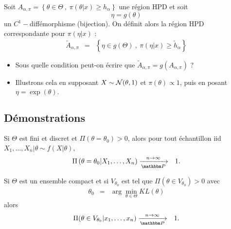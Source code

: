 \documentclass[10pt]{article}
\begin{document}
\if{}
\begin{exec}
Soit $A_{\alpha,\pi}=\left\{\theta\in\Theta  \ , \ \pi(\theta|x)\geq h_{\alpha}\right\}$ une région HPD et soit 
$$
\eta = g(\theta)
$$
un $C^1-$diffémorphisme (bijection). On définit alors la région HPD correspondante pour $\pi(\eta|x)$ :
\begin{eqnarray*}
\tilde{A}_{\alpha,\pi} & = & \left\{\eta\in g(\Theta)  \ , \ \pi(\eta|x)\geq \tilde{h}_{\alpha}\right\}
\end{eqnarray*}
\begin{itemize}
    \item Sous quelle condition peut-on écrire que $\tilde{A}_{\alpha,\pi}=g\left(A_{\alpha,\pi}\right)$ ?
    \item Illustrons cela en supposant $X\sim{\cal{N}}(\theta,1)$ et $\pi(\theta)\propto 1$, puis en posant $\eta=\exp(\theta)$.
\end{itemize}
\end{exec}

 
\fi



\subsection{Démonstrations}

\if{}
\begin{theorem}
Si $\Theta$ est fini et discret et $\Pi(\theta=\theta_0)>0$, alors pour tout échantillon iid $X_1,\ldots,X_n|\theta\sim f(X|\theta)$,
\begin{eqnarray*}
\Pi\left(\theta=\theta_0|X_1,\ldots,X_n\right) & \xrightarrow[\Pp]{n\to\infty} & 1.
\end{eqnarray*}
\end{theorem}

 
\fi

\if{}
\begin{theorem}
Si $\Theta$ est un ensemble compact et si $V_{\theta_0}$ est tel que $\Pi(\theta\in V_{\theta_0})>0$ avec
\begin{eqnarray*}
\theta_0 & = & \arg\min\limits_{\theta\in\Theta} KL(\theta)
\end{eqnarray*}
alors 
\begin{eqnarray*}
\Pi(\theta\in V_{\theta_0}|x_1,\ldots,x_n) & \xrightarrow[\Pp]{n\to\infty} & 1.
\end{eqnarray*}
\end{theorem}
\end{document}
